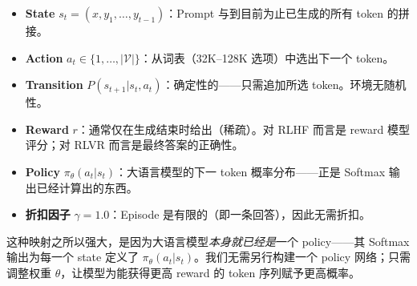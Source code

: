 \begin{itemize}
  \item \textbf{State} $s_t = (x, y_1, \ldots, y_{t-1})$：Prompt 与到目前为止已生成的所有 token 的拼接。
  \item \textbf{Action} $a_t \in \{1, \ldots, |\mathcal{V}|\}$：从词表（32K--128K 选项）中选出下一个 token。
  \item \textbf{Transition} $P(s_{t+1}|s_t, a_t)$：确定性的——只需追加所选 token。环境无随机性。
  \item \textbf{Reward} $r$：通常仅在生成结束时给出（稀疏）。对 RLHF 而言是 reward 模型评分；对 RLVR 而言是最终答案的正确性。
  \item \textbf{Policy} $\pi_\theta(a_t|s_t)$：大语言模型的下一 token 概率分布——正是 Softmax 输出已经计算出的东西。
  \item \textbf{折扣因子} $\gamma = 1.0$：Episode 是有限的（即一条回答），因此无需折扣。
\end{itemize}

这种映射之所以强大，是因为大语言模型\emph{本身就已经是}一个 policy——其 Softmax 输出为每一个 state 定义了 $\pi_\theta(a_t|s_t)$。我们无需另行构建一个 policy 网络；只需调整权重 $\theta$，让模型为能获得更高 reward 的 token 序列赋予更高概率。

